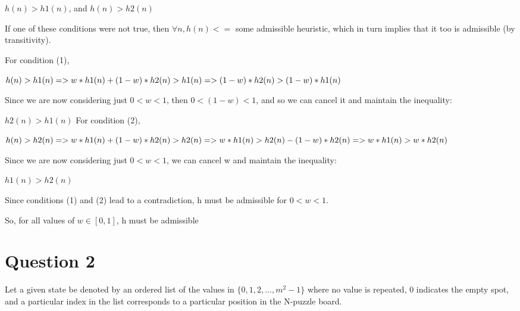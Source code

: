 \documentclass{article}
\begin{document}
\begin{enumerate}
        $h(n) > h1(n)$, and\newline
        $h(n) > h2(n)$
        
        If one of these conditions were not true, then $\forall n, h(n) <=$ some admissible heuristic, which in turn implies that it too is admissible (by transitivity).
        
        For condition (1),
        
        $h(n) > h1(n) =>
        \newline
        w*h1(n) + (1-w)*h2(n) > h1(n) =>
        \newline
        (1-w) * h2(n) > (1-w) * h1(n)
        $
        \newline
        
        Since we are now considering just $0 < w < 1$, then $0 < (1-w) < 1$, and so we can cancel it and maintain the inequality:
        
        $h2(n) > h1(n)$
        \newline
        \newline
        \newline
        For condition (2),
        
        $h(n) > h2(n) =>
        \newline
        w*h1(n) + (1-w)*h2(n) > h2(n) =>
        \newline
        w*h1(n) > h2(n) - (1-w)*h2(n) =>
        \newline
        w*h1(n) > w*h2(n)
        $
        
        Since we are now considering just $0 < w < 1$, we can cancel w and maintain the inequality:
        
        $h1(n) > h2(n)$

        Since conditions (1) and (2) lead to a contradiction, h must be admissible for $0 < w < 1$.\newline
        
        So, for all values of $w \in [0,1]$, h must be admissible
    \end{enumerate}
    
    
    
    \newpage
    \section*{Question 2}
    
    Let a given state be denoted by an ordered list of the values in $\{0, 1, 2, ..., m^2-1\}$ where no value is repeated, 0 indicates the empty spot, and a particular index in the list corresponds to a particular position in the N-puzzle board.\newline
    
\end{document}
